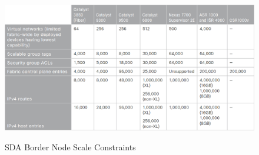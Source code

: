 \begin{figure}[H]
	\centering
	\includegraphics[width=1\linewidth]{img/MaximumScale-BorderNode.png}\\[1px]
	\caption{SDA Border Node Scale Constraints}
	\label{fig:SDA Border Node Scale Constraints}
\end{figure}

\pagebreak
